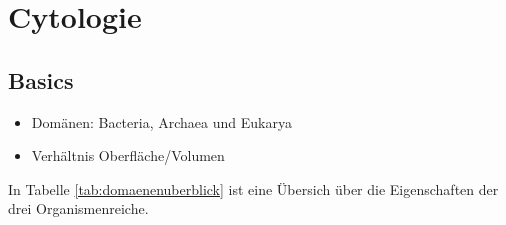\section{Cytologie}

\subsection{Basics}

	\begin{itemize}
		\item Domänen: Bacteria, Archaea und Eukarya
		\item Verhältnis Oberfläche/Volumen 
	\end{itemize}

	In Tabelle \ref{tab:domaenenuberblick} ist eine Übersich über die Eigenschaften der drei Organismenreiche.	

